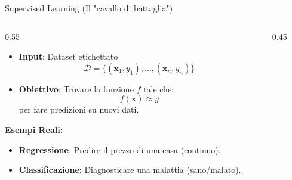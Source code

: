 \documentclass[aspectratio=169, 10pt]{beamer}
\begin{document}
\begin{frame}{Supervised Learning (Il "cavallo di battaglia")}
    \begin{columns}[T]
        \begin{column}{0.55\textwidth}
            \vspace{0.5em}
            \begin{itemize}
                \item \textbf{Input}: Dataset etichettato
                \[ \mathcal{D} = \{(\mathbf{x}_1, y_1), \dots, (\mathbf{x}_n, y_n)\} \]
                \item \textbf{Obiettivo}: Trovare la funzione $f$ tale che:
                \[ f(\mathbf{x}) \approx y \]
                per fare predizioni su nuovi dati.
            \end{itemize}
            
            \vspace{1em}
            \textbf{Esempi Reali:}
            \begin{itemize}
                \item \textcolor{Accent}{\textbf{Regressione}}: Predire il prezzo di una casa (continuo).
                \item \textcolor{Secondary}{\textbf{Classificazione}}: Diagnosticare una malattia (sano/malato).
            \end{itemize}
        \end{column}

        \begin{column}{0.45\textwidth}
            \centering
\end{column}
\end{columns}
\end{frame}
\end{document}
